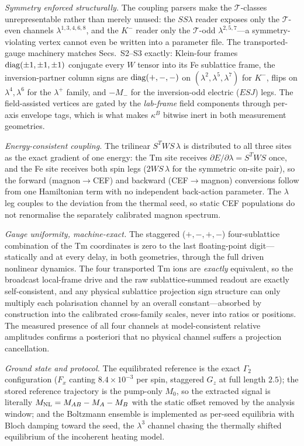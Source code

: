 \documentclass[11pt,a4paper]{article}
\newcommand{\Mnl}{M_{\rm NL}}
\begin{document}
\emph{Symmetry enforced structurally.}  The coupling parsers make the
$\mathcal T$-classes unrepresentable rather than merely unused: the
$SS\lambda$ reader exposes only the $\mathcal T$-even channels
$\lambda^{1,3,4,6,8}$, and the $K^-$ reader only the $\mathcal T$-odd
$\lambda^{2,5,7}$---a symmetry-violating vertex cannot even be
written into a parameter file.  The transported-gauge machinery
matches Secs.~S2--S3 exactly: Klein-four frames
${\rm diag}(\pm1,\pm1,\pm1)$ conjugate every $W$ tensor into its Fe
sublattice frame, the inversion-partner column signs are
${\rm diag}(+,-,-)$ on $(\lambda^2,\lambda^5,\lambda^7)$ for $K^-$,
flips on $\lambda^{4},\lambda^{6}$ for the $\lambda^+$ family, and
$-M_-$ for the inversion-odd electric ($ESJ$) legs.  The
field-assisted vertices are gated by the \emph{lab-frame} field
components through per-axis envelope tags, which is what makes
$\kappa^B$ bitwise inert in both measurement geometries.

\emph{Energy-consistent coupling.}  The trilinear
$S^TWS\,\lambda$ is distributed to all three sites as the exact
gradient of one energy: the Tm site receives
$\partial E/\partial\lambda = S^TWS$ once, and the Fe site receives
both spin legs ($2WS\,\lambda$ for the symmetric on-site pair), so
the forward (magnon$\to$CEF) and backward (CEF$\to$magnon)
conversions follow from one Hamiltonian term with no independent
back-action parameter.  The $\lambda$ leg couples to the deviation
from the thermal seed, so static CEF populations do not renormalise
the separately calibrated magnon spectrum.

\emph{Gauge uniformity, machine-exact.}  The staggered
($+,-,+,-$) four-sublattice combination of the Tm coordinates is
zero to the last floating-point digit---statically and at every
delay, in both geometries, through the full driven nonlinear
dynamics.  The four transported Tm ions are \emph{exactly}
equivalent, so the broadcast local-frame drive and the raw
sublattice-summed readout are exactly self-consistent, and any
physical sublattice projection sign structure can only multiply each
polarisation channel by an overall constant---absorbed by
construction into the calibrated cross-family scales, never into
ratios or positions.  The measured presence of all four channels at
model-consistent relative amplitudes confirms a posteriori that no
physical channel suffers a projection cancellation.

\emph{Ground state and protocol.}  The equilibrated reference is the
exact $\Gamma_2$ configuration ($F_x$ canting $8.4\times10^{-3}$ per
spin, staggered $G_z$ at full length $2.5$); the stored reference
trajectory is the pump-only $M_0$, so the extracted signal is
literally $\Mnl=M_{AB}-M_A-M_B$ with the static offset removed by
the analysis window; and the Boltzmann ensemble is implemented as
per-seed equilibria with Bloch damping toward the seed, the
$\lambda^3$ channel chasing the thermally shifted equilibrium of the
incoherent heating model.
\end{document}
